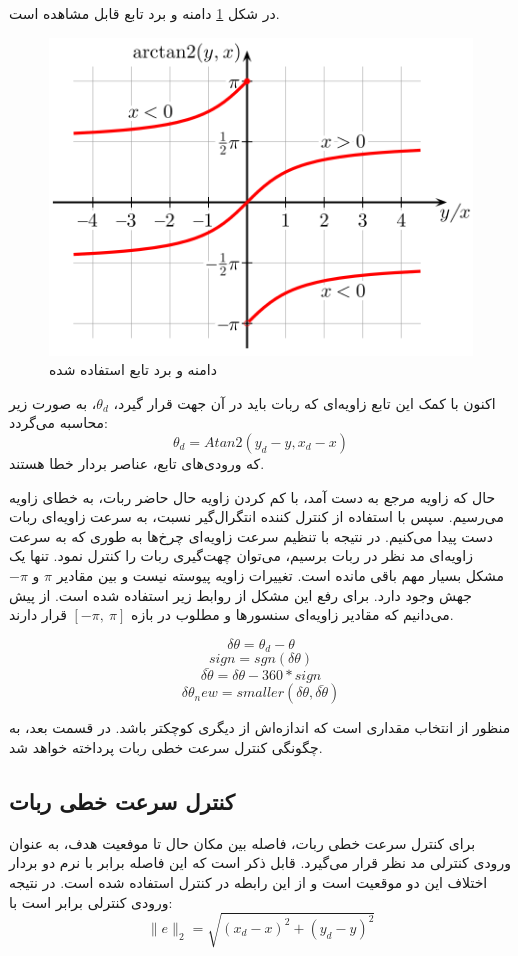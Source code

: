 در شکل \ref{Fig atan2} دامنه و برد تابع  قابل مشاهده است.
\begin{figure}[!h] 
	\centering
	\includegraphics[scale=0.8]{Images/atan2.png}
	\caption{دامنه و برد تابع استفاده شده} \label{Fig atan2}
\end{figure}

اکنون با کمک این تابع زاویه‌ای که ربات باید در آن جهت قرار گیرد، $\theta_d$، به صورت زیر محاسبه می‌گردد:
\begin{equation}
\theta_d = Atan2(y_d - y, x_d - x)
\end{equation}
که ورودی‌های تابع، عناصر بردار خطا هستند.

حال که زاویه مرجع به دست آمد، با کم کردن زاویه حال حاضر ربات، به خطای زاویه می‌رسیم. سپس با استفاده از کنترل کننده انتگرال‌گیر نسبت، به سرعت زاویه‌ای ربات دست پیدا می‌کنیم. در نتیجه با تنظیم سرعت زاویه‌ای چرخ‌ها به طوری که به سرعت زاویه‌ای مد نظر در ربات برسیم، می‌توان چهت‌گیری ربات را کنترل نمود. تنها یک مشکل بسیار مهم باقی‌ مانده است. تغییرات زاویه پیوسته نیست و بین مقادیر $\pi$ و $-\pi$ جهش وجود دارد. برای رفع این مشکل از روابط زیر استفاده شده است. از پیش می‌دانیم که مقادیر زاویه‌ای سنسورها و مطلوب در بازه $[-\pi,~\pi]$ قرار دارند.

	$$\delta \theta = \theta_d - \theta$$
	$$sign = sgn(\delta \theta)$$
	$$\bar{\delta \theta} = \delta \theta - 360*sign$$
	$$\delta \theta_new = smaller(\delta \theta, \bar{\delta \theta})$$
	
منظور از  انتخاب مقداری است که اندازه‌اش از دیگری کوچکتر باشد. در قسمت بعد، به چگونگی کنترل سرعت خطی ربات پرداخته خواهد شد. 

\subsection{کنترل سرعت خطی ربات}
برای کنترل سرعت خطی ربات، فاصله بین مکان حال تا موفعیت هدف، به عنوان ورودی کنترلی مد نظر قرار می‌گیرد. قابل ذکر است که این فاصله برابر با نرم دو بردار اختلاف این دو موقعیت است و از این رابطه در کنترل استفاده شده است. در نتیجه ورودی کنترلی برابر است با:
\begin{equation}
\|e\|_2 = \sqrt{(x_d - x)^{2} + (y_d - y)^{2}}
\end{equation}

